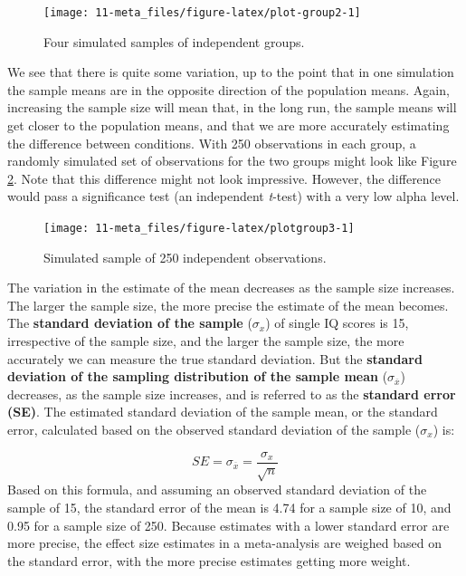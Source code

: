 \documentclass[
  oneside]{krantz}
\begin{document}
\begin{figure}

{\centering \texttt{[image: 11-meta\_files/figure-latex/plot-group2-1]} 

}

\caption{Four simulated samples of independent groups.}\label{fig:plot-group2}
\end{figure}

We see that there is quite some variation, up to the point that in one simulation the sample means are in the opposite direction of the population means. Again, increasing the sample size will mean that, in the long run, the sample means will get closer to the population means, and that we are more accurately estimating the difference between conditions. With 250 observations in each group, a randomly simulated set of observations for the two groups might look like Figure \ref{fig:plotgroup3}. Note that this difference might not look impressive. However, the difference would pass a significance test (an independent \emph{t}-test) with a very low alpha level.



\begin{figure}

{\centering \texttt{[image: 11-meta\_files/figure-latex/plotgroup3-1]} 

}

\caption{Simulated sample of 250 independent observations.}\label{fig:plotgroup3}
\end{figure}

The variation in the estimate of the mean decreases as the sample size increases. The larger the sample size, the more precise the estimate of the mean becomes. The \textbf{standard deviation of the sample} (\(\sigma_x\)) of single IQ scores is 15, irrespective of the sample size, and the larger the sample size, the more accurately we can measure the true standard deviation. But the \textbf{standard deviation of the sampling distribution of the sample mean} (\(\sigma_{\overline{x}}\)) decreases, as the sample size increases, and is referred to as the \textbf{standard error (SE)}. The estimated standard deviation of the sample mean, or the standard error, calculated based on the observed standard deviation of the sample (\(\sigma_x\)) is:

\[SE = \sigma_{\overline{x}} =  \frac{\sigma_x}{\sqrt{n}}\]
Based on this formula, and assuming an observed standard deviation of the sample of 15, the standard error of the mean is 4.74 for a sample size of 10, and 0.95 for a sample size of 250. Because estimates with a lower standard error are more precise, the effect size estimates in a meta-analysis are weighed based on the standard error, with the more precise estimates getting more weight.
\end{document}
